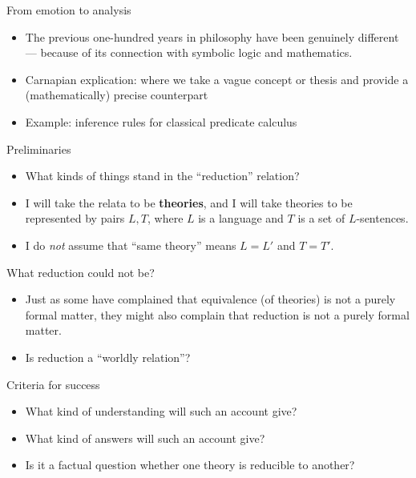 \documentclass[fleqn]{beamer}
\begin{document}
\begin{frame}{From emotion to analysis}

  \begin{itemize}
  \item The previous one-hundred years in philosophy have been
    genuinely different --- because of its connection with symbolic
    logic and mathematics.
  \item Carnapian explication: where we take a vague concept or thesis
    and provide a (mathematically) precise counterpart
  \item Example: inference rules for classical predicate
    calculus
  \end{itemize}

\end{frame}

\begin{frame}{Preliminaries}

  \begin{itemize}
  \item What kinds of things stand in the ``reduction'' relation?
  \item I will take the relata to be \textbf{theories}, and I will
    take theories to be represented by pairs $L,T$, where $L$ is a
    language and $T$ is a set of $L$-sentences.
  \item I do \emph{not} assume that ``same theory'' means $L=L'$ and
    $T=T'$.
  \end{itemize}
\end{frame}

\begin{frame}{What reduction could not be?}

  \begin{itemize}
  \item Just as some have complained that equivalence (of theories) is
    not a purely formal matter, they might also complain that
    reduction is not a purely formal matter.
  \item Is reduction a ``worldly relation''?
  \end{itemize}  
\end{frame}

\begin{frame}{Criteria for success}

  \begin{itemize}
  \item What kind of understanding will such an account give?
  \item What kind of answers will such an account give?
  \item Is it a factual question whether one theory is reducible to
    another?
  \end{itemize}

\end{frame}
\end{document}
